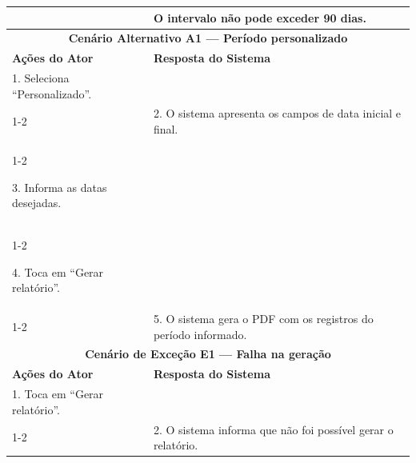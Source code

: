 \begin{longtable}{| p{} | p{} |}
&
O intervalo não pode exceder 90 dias. \\
\hline

\multicolumn{2}{|c|}{\textbf{Cenário Alternativo A1 --- Período personalizado}}\\
\hline

\textbf{Ações do Ator} &
\textbf{Resposta do Sistema} \\
\hline

1. Seleciona ``Personalizado''. & \\
\cline{1-2}

&
2. O sistema apresenta os campos de data inicial e final. \\
\cline{1-2}

3. Informa as datas desejadas. & \\
\cline{1-2}

4. Toca em ``Gerar relatório''. & \\
\cline{1-2}

&
5. O sistema gera o PDF com os registros do período informado. \\
\hline

\multicolumn{2}{|c|}{\textbf{Cenário de Exceção E1 --- Falha na geração}}\\
\hline

\textbf{Ações do Ator} &
\textbf{Resposta do Sistema} \\
\hline

1. Toca em ``Gerar relatório''. & \\
\cline{1-2}

&
2. O sistema informa que não foi possível gerar o relatório. \\
\hline

\end{longtable}
